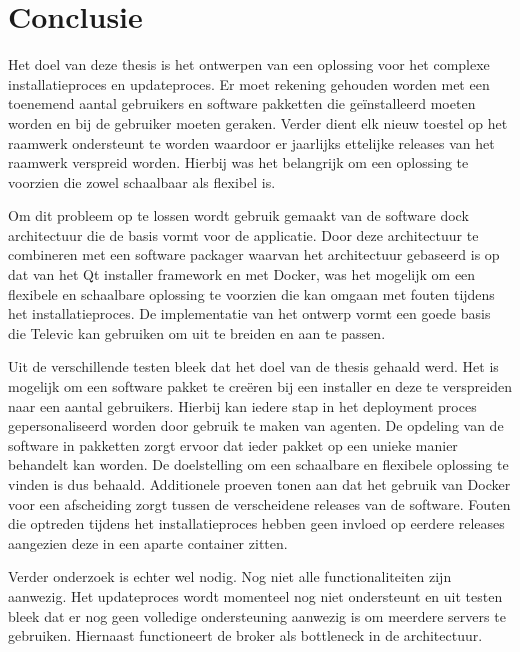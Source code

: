 \chapter{Conclusie}
Het doel van deze thesis is het ontwerpen van een oplossing voor het complexe installatieproces en updateproces.
Er moet rekening gehouden worden met een toenemend aantal gebruikers en software pakketten die geïnstalleerd moeten worden en bij de gebruiker moeten geraken.
Verder dient elk nieuw toestel op het raamwerk ondersteunt te worden waardoor er jaarlijks ettelijke releases van het raamwerk verspreid worden.
Hierbij was het belangrijk om een oplossing te voorzien die zowel schaalbaar als flexibel is.

Om dit probleem op te lossen wordt gebruik gemaakt van de software dock architectuur die de basis vormt voor de applicatie.
Door deze architectuur te combineren met een software packager waarvan het architectuur gebaseerd is op dat van het Qt installer framework en met Docker, was het mogelijk om een flexibele en schaalbare oplossing te voorzien die kan omgaan met fouten tijdens het installatieproces.
De implementatie van het ontwerp vormt een goede basis die Televic kan gebruiken om uit te breiden en aan te passen.

Uit de verschillende testen bleek dat het doel van de thesis gehaald werd.
Het is mogelijk om een software pakket te creëren bij een installer en deze te verspreiden naar een aantal gebruikers.
Hierbij kan iedere stap in het deployment proces gepersonaliseerd worden door gebruik te maken van agenten.
De opdeling van de software in pakketten zorgt ervoor dat ieder pakket op een unieke manier behandelt kan worden.
De doelstelling om een schaalbare en flexibele oplossing te vinden is dus behaald.
Additionele proeven tonen aan dat het gebruik van Docker voor een afscheiding zorgt tussen de verscheidene releases van de software.
Fouten die optreden tijdens het installatieproces hebben geen invloed op eerdere releases aangezien deze in een aparte container zitten.

Verder onderzoek is echter wel nodig.
Nog niet alle functionaliteiten zijn aanwezig.
Het updateproces wordt momenteel nog niet ondersteunt en uit testen bleek dat er nog geen volledige ondersteuning aanwezig is om meerdere servers te gebruiken.
Hiernaast functioneert de broker als bottleneck in de architectuur.
